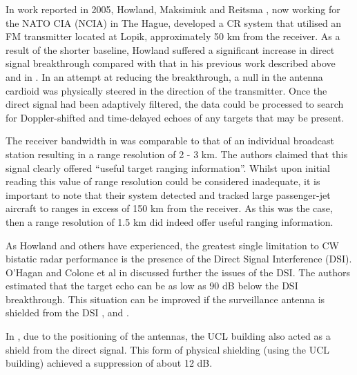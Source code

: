 In work reported in 2005, Howland, Maksimiuk and Reitsma \cite{howland2005}, now working for the NATO CIA (NCIA) in The Hague, developed a CR system that utilised an FM transmitter located at Lopik, approximately 50 km from the receiver.  As a result of the shorter baseline, Howland suffered a significant increase in direct signal breakthrough compared with that in his previous work described above and in \cite{howland1999}.  In an attempt at reducing the breakthrough, a null in the antenna cardioid was physically steered in the direction of the transmitter.  Once the direct signal had been adaptively filtered, the data could be processed to search for Doppler-shifted and time-delayed echoes of any targets that may be present. 

The receiver bandwidth in \cite{howland2005} was comparable to that of an individual broadcast station resulting in a range resolution of 2 - 3 km.  The authors claimed that this signal clearly offered ``useful target ranging information''.  Whilst upon initial reading this value of range resolution could be considered inadequate, it is important to note that their system detected and tracked large passenger-jet aircraft to ranges in excess of 150 km from the receiver.  As this was the case, then a range resolution of 1.5 km did indeed offer useful ranging information.

As Howland and others have experienced, the greatest single limitation to CW bistatic radar performance is the presence of the Direct Signal Interference (DSI).  O'Hagan and Colone et al in \cite{ohagan1} discussed further the issues of the DSI.  The authors estimated that the target echo can be as low as 90 dB below the DSI breakthrough.  This situation can be improved if the surveillance antenna is shielded from the DSI \cite{ohagan2}, \cite{ohagan3} and \cite{ohagan4}.

In \cite{ohagan1}, due to the positioning of the antennas, the UCL building also acted as a shield from the direct signal.  This form of physical shielding (using the UCL building) achieved a suppression of about 12 dB. 

